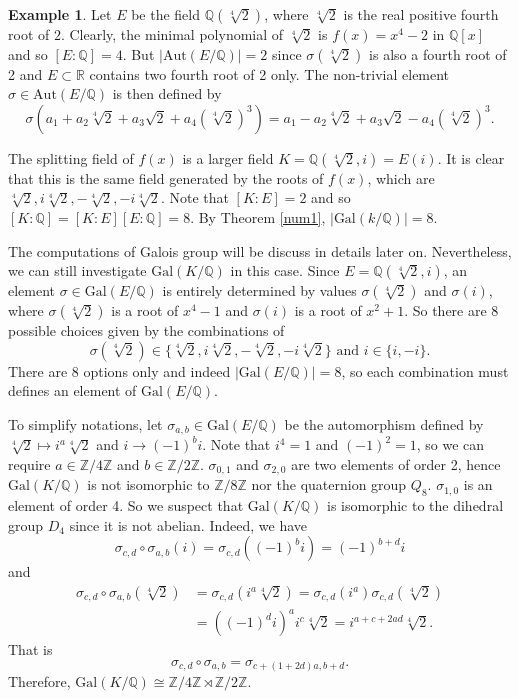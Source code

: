\documentclass[12pt]{report}
\theoremstyle{definition}
\newtheorem{example}[thm]{Example}
\def\ZZ{\mathbb{Z}}
\def\QQ{\mathbb{Q}}
\def\RR{\mathbb{R}}
\def\Aut{\text{Aut}}
\def\Gal{\text{Gal}}
\begin{document}
\begin{example}
    Let $E$ be the field $\QQ(\sqrt[4]{2})$, where $\sqrt[4]{2}$ is the real positive fourth root of $2$. Clearly, the minimal polynomial of $\sqrt[4]{2}$ is $f(x)=x^4-2$ in $\QQ[x]$ and so $[E:\QQ]=4$. But $|\Aut(E/\QQ)|=2$ since $\sigma(\sqrt[4]{2})$ is also a fourth root of 2 and $E\subset \RR$ contains two fourth root of 2 only. The non-trivial element $\sigma\in\Aut(E/\QQ)$ is then defined by $$\sigma(a_1+a_2\sqrt[4]{2} +a_3\sqrt{2} +a_4 (\sqrt[4]{2})^3) =a_1-a_2\sqrt[4]{2} +a_3\sqrt{2} -a_4 (\sqrt[4]{2})^3.$$


    The splitting field of $f(x)$ is a larger field $K=\QQ(\sqrt[4]{2},i)=E(i)$. It is clear that this is the same field generated by the roots of $f(x)$, which are $\sqrt[4]{2},i\sqrt[4]{2},-\sqrt[4]{2},-i\sqrt[4]{2}$. Note that $[K:E]=2$ and so $[K:\QQ]=[K:E][E:\QQ]=8$. By Theorem \ref{num1}, $|\Gal(k/\QQ)|=8$.

    The computations of Galois group will be discuss in details later on. Nevertheless, we can still investigate $\Gal(K/\QQ)$ in this case. Since $E=\QQ(\sqrt[4]{2},i)$, an element $\sigma\in \Gal(E/\QQ)$ is entirely determined by values $\sigma(\sqrt[4]{2})$ and $\sigma(i)$, where $\sigma(\sqrt[4]{2})$ is a root of $x^4-1$ and $\sigma(i)$ is a root of $x^2+1$. So there are 8 possible choices given by the combinations of $$\sigma(\sqrt[4]{2})\in\{\sqrt[4]{2},i\sqrt[4]{2},-\sqrt[4]{2},-i\sqrt[4]{2}\}\mbox{ and }i\in\{i,-i\}.$$
    There are 8 options only and indeed $|\Gal(E/\QQ)|=8$, so each combination must defines an element of $\Gal(E/\QQ)$. 
    
    To simplify notations, let $\sigma_{a,b}\in \Gal(E/\QQ)$ be the automorphism defined by $\sqrt[4]{2}\mapsto i^a \sqrt[4]{2}$ and $i\to (-1)^bi$. Note that $i^4=1$ and $(-1)^2=1$, so we can require $a\in\ZZ/4\ZZ$ and $b\in \ZZ/2\ZZ$. $\sigma_{0,1}$ and $\sigma_{2,0}$ are two elements of order 2, hence $\Gal(K/\QQ)$ is not isomorphic to $\ZZ/8\ZZ$ nor the quaternion group $Q_8$. $\sigma_{1,0}$ is an element of order 4. So we suspect that $\Gal(K/\QQ)$ is isomorphic to the dihedral group $D_4$ since it is not abelian. Indeed, we have $$\sigma_{c,d}\circ\sigma_{a,b}(i) = \sigma_{c,d}((-1)^b i) = (-1)^{b+d} i$$
    and \begin{align*}
        \sigma_{c,d}\circ\sigma_{a,b}(\sqrt[4]{2}) &= \sigma_{c,d}(i^a \sqrt[4]{2}) =  \sigma_{c,d}(i^a)\sigma_{c,d}(\sqrt[4]{2}) \\
        &= ((-1)^d i)^a i^c\sqrt[4]{2} = i^{a+c+2ad} \sqrt[4]{2}.
    \end{align*}
    That is $$\sigma_{c,d}\circ\sigma_{a,b} = \sigma_{c+(1+2d)a,b+d}.$$ Therefore, $\Gal(K/\QQ) \cong \ZZ/4\ZZ \rtimes \ZZ/2\ZZ.$
\end{example}
\end{document}
